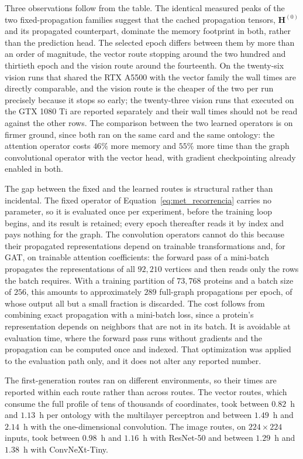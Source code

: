\documentclass[Ingles]{ic-tese-v3}
\begin{document}
\begin{appendices}{}
Three observations follow from the table. The identical measured peaks of the two fixed-propagation
families suggest that the cached propagation tensors, $\mathbf{H}^{(0)}$ and its propagated
counterpart, dominate the memory footprint in both, rather than the prediction head. The selected epoch differs between them by more than an order of magnitude, the vector route
stopping around the two hundred and thirtieth epoch and the vision route around the fourteenth. On the twenty-six vision runs that shared the RTX A5500 with the vector family the wall times are
directly comparable, and the vision route is the cheaper of the two per run precisely because it
stops so early; the twenty-three vision runs that executed on the GTX 1080 Ti are reported
separately and their wall times should not be read against the other rows. The
comparison between the two learned operators is on firmer ground, since both ran on the same card
and the same ontology: the attention operator costs $46\%$ more memory and $55\%$ more time than the
graph convolutional operator with the vector head, with gradient checkpointing already enabled in
both.

The gap between the fixed and the learned routes is structural rather than incidental. The fixed
operator of Equation~\eqref{eq:met_recorrencia} carries no parameter, so it is evaluated once per
experiment, before the training loop begins, and its result is retained; every epoch thereafter reads
it by index and pays nothing for the graph. The convolution operators cannot do this because their propagated representations depend on trainable transformations and, for GAT, on trainable attention coefficients: the forward pass of a mini-batch propagates the
representations of all $92{,}210$ vertices and then reads only the rows the batch requires. With a
training partition of $73{,}768$ proteins and a batch size of $256$, this amounts to approximately
$289$ full-graph propagations per epoch, of whose output all but a small fraction is discarded. The cost follows from combining exact propagation with a mini-batch loss, since a
protein's representation depends on neighbors that are not in its batch. It is avoidable at
evaluation time, where the forward pass runs without gradients and the propagation can be computed
once and indexed. That optimization was applied to the evaluation path only, and it does not alter
any reported number.

The first-generation routes ran on different environments, so their times are reported within each
route rather than across routes. The vector routes, which consume the full profile of tens of
thousands of coordinates, took between $0.82$~h and $1.13$~h per ontology with the multilayer
perceptron and between $1.49$~h and $2.14$~h with the one-dimensional convolution. The image routes,
on $224 \times 224$ inputs, took between $0.98$~h and $1.16$~h with ResNet-50 and between $1.29$~h
and $1.38$~h with ConvNeXt-Tiny.


\end{appendices}
\end{document}
